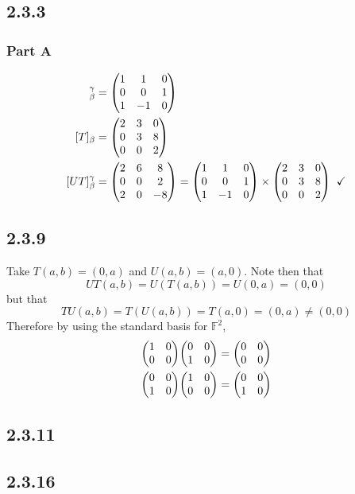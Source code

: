 \documentclass[12pt,titlepage]{extarticle}
\begin{document}
\subsection*{2.3.3}
\subsubsection*{Part A}
\begin{align*}
    [U]_{\beta}^{\gamma} &= \mqty(
        1 & 1  & 0 \\
        0 & 0  & 1 \\
        1 & -1 & 0 \\
    ) \\
    [T]_{\beta} &= \mqty(
        2 & 3 & 0 \\
        0 & 3 & 8 \\
        0 & 0 & 2 \\
    ) \\
    [UT]_{\beta}^\gamma &= \mqty(
        2 & 6 & 8 \\
        0 & 0 & 2 \\
        2 & 0 & -8 \\
    ) = \mqty(
        1 & 1  & 0 \\
        0 & 0  & 1 \\
        1 & -1 & 0 \\
    ) \times \mqty(
        2 & 3 & 0 \\
        0 & 3 & 8 \\
        0 & 0 & 2 \\
    ) \;\; \checkmark
\end{align*}

\subsection*{2.3.9}
Take $T(a, b) = (0, a)$ and $U(a,b) = (a, 0)$. Note then that
\[
    UT(a,b) = U(T(a,b)) = U(0,a) = (0,0)
\]
but that
\[
    TU(a,b) = T(U(a,b)) = T(a,0) = (0, a) \neq (0,0)
\]
Therefore by using the standard basis for $\mathbb{F}^2$,
\begin{align*}
    \mqty(
    1 & 0 \\
    0 & 0 \\
    )
    \mqty(
    0 & 0 \\
    1 & 0 \\
    ) &= \mqty(
    0 & 0 \\  
    0 & 0 \\  
    ) \\
    \mqty(
    0 & 0 \\
    1 & 0 \\
    )
    \mqty(
    1 & 0 \\
    0 & 0 \\
    ) &= \mqty(
    0 & 0 \\  
    1 & 0 \\  
    ) \\
\end{align*}

\subsection*{2.3.11}

\subsection*{2.3.16}
\end{document}
